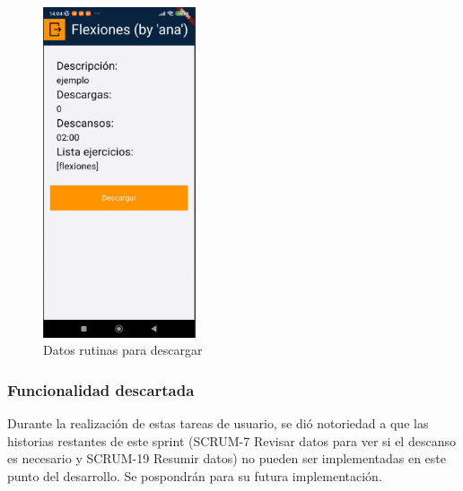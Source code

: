 \begin{figure}[H]
   \centering
    \includegraphics[width=0.4\textwidth]{pantallas/datosRutinasDesc.png}
    \caption{Datos rutinas para descargar}
    \label{fig:datosRutinasDesc}
\end{figure}


\subsubsection{Funcionalidad descartada}

Durante la realización de estas tareas de usuario, se dió notoriedad a que las historias restantes de este sprint (SCRUM-7 Revisar datos para ver si el descanso es necesario y SCRUM-19 Resumir datos) no pueden ser implementadas en este punto del desarrollo. Se pospondrán para su futura implementación.

